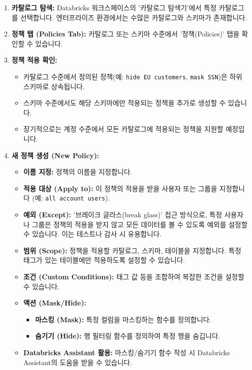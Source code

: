 \documentclass[11pt,a4paper]{article}
\theoremstyle{definition}
\begin{document}
\begin{enumerate}
    \item \textbf{카탈로그 탐색:} Databricks 워크스페이스의 '카탈로그 탐색기'에서 특정 카탈로그를 선택합니다. 엔터프라이즈 환경에서는 수많은 카탈로그와 스키마가 존재합니다.
    \item \textbf{정책 탭 (Policies Tab):} 카탈로그 또는 스키마 수준에서 '정책(Policies)' 탭을 확인할 수 있습니다.
    \item \textbf{정책 적용 확인:}
    \begin{itemize}
        \item 카탈로그 수준에서 정의된 정책(예: \texttt{hide EU customers}, \texttt{mask SSN})은 하위 스키마로 상속됩니다.
        \item 스키마 수준에서도 해당 스키마에만 적용되는 정책을 추가로 생성할 수 있습니다.
        \item 장기적으로는 계정 수준에서 모든 카탈로그에 적용되는 정책을 지원할 예정입니다.
    \end{itemize}
    \item \textbf{새 정책 생성 (New Policy):}
    \begin{itemize}
        \item \textbf{이름 지정:} 정책의 이름을 지정합니다.
        \item \textbf{적용 대상 (Apply to):} 이 정책의 적용을 받을 사용자 또는 그룹을 지정합니다 (예: \texttt{all account users}).
        \item \textbf{예외 (Except):} '브레이크 글라스(break glass)' 접근 방식으로, 특정 사용자나 그룹은 정책의 적용을 받지 않고 모든 데이터를 볼 수 있도록 예외를 설정할 수 있습니다. 이는 테스트나 감사 시 유용합니다.
        \item \textbf{범위 (Scope):} 정책을 적용할 카탈로그, 스키마, 테이블을 지정합니다. 특정 태그가 있는 테이블에만 적용하도록 설정할 수 있습니다.
        \item \textbf{조건 (Custom Conditions):} 태그 값 등을 조합하여 복잡한 조건을 설정할 수 있습니다.
        \item \textbf{액션 (Mask/Hide):}
        \begin{itemize}
            \item \textbf{마스킹 (Mask):} 특정 컬럼을 마스킹하는 함수를 정의합니다.
            \item \textbf{숨기기 (Hide):} 행 필터링 함수를 정의하여 특정 행을 숨깁니다.
        \end{itemize}
        \item \textbf{Databricks Assistant 활용:} 마스킹/숨기기 함수 작성 시 Databricks Assistant의 도움을 받을 수 있습니다.

\end{itemize}
\end{enumerate}
\end{document}
